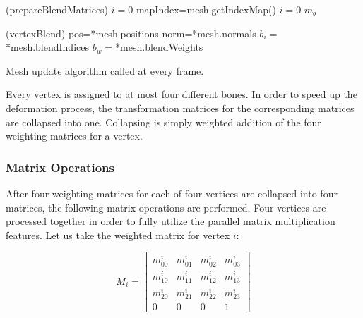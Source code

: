 \begin{algorithm}[ht]
\DontPrintSemicolon %
\function(prepareBlendMatrices){
$i=0$\;
\;
mapIndex=mesh.getIndexMap() 
$i=0$\;
\;
\Return $m_b$\;
}

\function(vertexBlend){
pos=*mesh.positions\;
norm=*mesh.normals\;
$b_i=$*mesh.blendIndices\;
$b_w=$*mesh.blendWeights\;
}
\caption{Mesh update algorithm called at every frame.}
\label{algo:updateMesh}
\end{algorithm}

Every vertex is assigned to at most four different bones. In order to speed up the deformation process, the transformation matrices for the corresponding matrices are collapsed into one. Collapsing is simply weighted addition of the four weighting matrices for a vertex.

\subsubsection{Matrix Operations}
After four weighting matrices for each of four vertices are collapsed into four matrices, the following matrix operations are performed. Four vertices are processed together in order to fully utilize the parallel matrix multiplication features. Let us take the weighted matrix for vertex $i$:

\begin{equation}
M_i=
\begin{bmatrix}
m_{00}^i & m_{01}^i & m_{02}^i & m_{03}^i \\
m_{10}^i & m_{11}^i & m_{12}^i & m_{13}^i \\
m_{20}^i & m_{21}^i & m_{22}^i & m_{23}^i \\
0 & 0 & 0 & 1
\end{bmatrix}
\label{eqn:weighted_matrix_for_i}
\end{equation}

